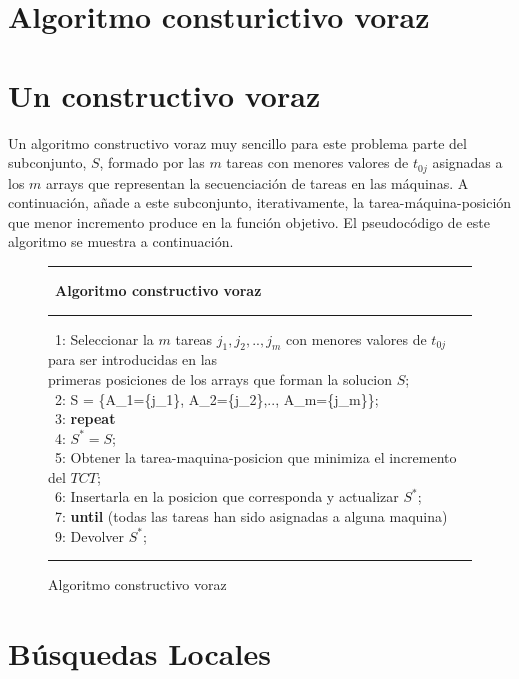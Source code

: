     \section{Algoritmo consturictivo voraz}

\section*{Un constructivo voraz}
Un algoritmo constructivo voraz muy sencillo para este problema parte del subconjunto, $S$, formado por las $m$ tareas con menores valores de $t_{0j}$ asignadas a los $m$ arrays que representan la secuenciaci\'on de tareas en las m\'aquinas. A continuaci\'on, a\~nade a este subconjunto, iterativamente, la tarea-m\'aquina-posici\'on que menor incremento produce en la funci\'on objetivo. El pseudoc\'odigo de este algoritmo se muestra a conti\-nuaci\'on.
\begin{figure}[h!]
{\small
 \hrule \
 {\bf\small Algoritmo constructivo voraz}
 \hrule
\begin{center}
\begin{tabbing}
\ 1: Seleccionar la $m$ tareas $j_1, j_2,.., j_m$ con menores valores de $t_{0j}$ para ser introducidas en las \\ primeras posiciones de los arrays que forman la solucion $S$;\\
\ 2: S = \{A_1=\{j_1\}, A_2=\{j_2\},.., A_m=\{j_m\}\};\\
\ 3: {\bf rep}\={\bf eat}\\
\ 4: \> $S^* = S$;\\
\ 5: \> Obtener la tarea-maquina-posicion que minimiza el incremento del $TCT$;\\
\ 6: \> Insertarla en la posicion que corresponda y actualizar $S^*$;\\
\ 7: {\bf until} (todas las tareas han sido asignadas a alguna maquina)\\
\ 9: Devolver $S^*$;
\end{tabbing}
\end{center}
\hrule
}
\caption{Algoritmo constructivo voraz}
\label{constructivo}
\end{figure}

\section{Búsquedas Locales}

